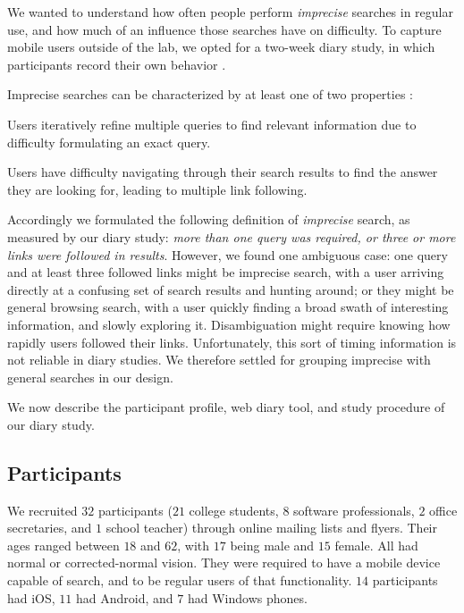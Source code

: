 We wanted to understand how often people perform \textit{imprecise} searches in regular use, and how much of an influence those searches have on difficulty. To capture mobile users outside of the lab, we opted for a two-week diary study, in which participants record their own behavior \cite{Sohn:2008}. 

Imprecise searches can be characterized by at least one of two properties \cite{Lee:2012}:

\begin{tight_enumerate}
\item Users iteratively refine multiple queries to find relevant information due to difficulty formulating an exact query. 
\item Users have difficulty navigating through their search results to find the answer they are looking for, leading to multiple link following.
\end{tight_enumerate}

Accordingly we formulated the following definition of \textit{imprecise} search, as measured by our diary study: \textit{more than one query was required, or three or more links were followed in results}. However, we found one ambiguous case: one query and at least three followed links might be imprecise search, with a user arriving directly at a confusing set of search results and hunting around; or they might be general browsing search, with a user quickly finding a broad swath of interesting information, and slowly exploring it. Disambiguation might require knowing how rapidly users followed their links. Unfortunately, this sort of timing information is not reliable in diary studies. We therefore settled for grouping imprecise with general searches in our design. 

We now describe the participant profile, web diary tool, and study procedure of our diary study.

\subsection{Participants}
We recruited $32$ participants ($21$ college students, $8$ software professionals, $2$ office secretaries, and $1$ school teacher) through online mailing lists and flyers. Their ages ranged between $18$ and $62$, with $17$ being male and $15$ female. All had normal or corrected-normal vision. They were required to have a mobile device capable of search, and to be regular users of that functionality. $14$ participants had iOS, $11$ had Android, and $7$ had Windows phones. 

